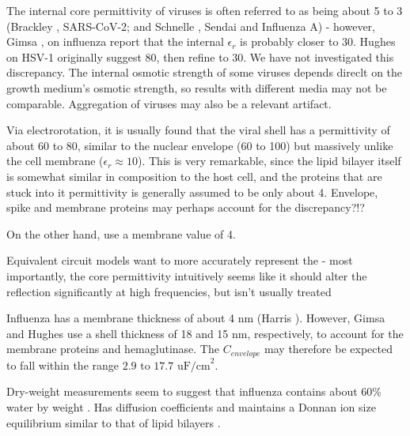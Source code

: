 \documentclass[fleqn,10pt]{paper}
\begin{document}
The internal core permittivity of viruses is often referred to as being about 5 to 3 (Brackley \cite{Electrostatic2020}, SARS-CoV-2; and Schnelle \cite{Trapping1996}, Sendai and Influenza A) - however, Gimsa \cite{New1999}, on influenza report that the internal $\epsilon_r$ is probably closer to 30. Hughes on HSV-1 originally suggest 80\cite{Manipulation1998}, then refine to 30\cite{Dielectrophoretic2001}. We have not investigated this discrepancy. The internal osmotic strength of some viruses depends direclt on the growth medium's osmotic strength\cite{Osmotic2003}, so results with different media may not be comparable. Aggregation of viruses may also be a relevant artifact. 

Via electrorotation, it is usually found that the viral shell has a permittivity of about 60 to 80, similar to the nuclear envelope (60 to 100) but massively unlike the cell membrane ($\epsilon_r\approx 10$). This is very remarkable, since the lipid bilayer itself is somewhat similar in composition to the host cell, and the proteins that are stuck into it permittivity is generally assumed to be only about 4. Envelope, spike and membrane proteins may perhaps account for the discrepancy?!?

On the other hand, \cite{Electrostatic2020a} use a membrane value of 4.

Equivalent circuit models want to more accurately represent the - most importantly, the core permittivity intuitively seems like it should alter the reflection significantly at high frequencies, but isn't usually treated 

Influenza has a membrane thickness of about 4 nm (Harris \cite{Influenza2006}). However, Gimsa and Hughes use a shell thickness of 18 and 15 nm, respectively, to account for the membrane proteins and hemaglutinase. The $C_{envelope}$ may therefore be expected to fall within the range $2.9 \text{ to } 17.7 \text{ uF/cm}^2$.

Dry-weight measurements seem to suggest that influenza contains about 60\% water by weight \cite{lauffer1944biophysical}. Has diffusion coefficients and maintains a Donnan ion size equilibrium similar to that of lipid bilayers \cite{Effect2015b}. 


% 
\end{document}
